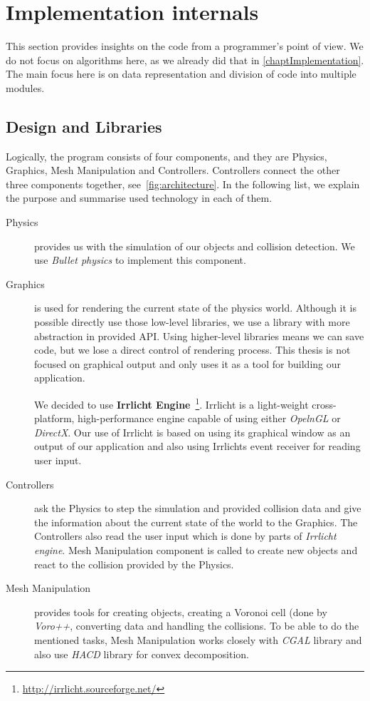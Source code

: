 \chapter{Implementation internals}
\label{app:implementation}

This section provides insights on the code from a programmer's point of view. We do not focus on algorithms here, as we already did that in \cref{chaptImplementation}. The main focus here is on data representation and division of code into multiple modules.

\section{Design and Libraries}
Logically, the program consists of four components, and they are Physics, Graphics, Mesh Manipulation and Controllers. Controllers connect the other three components together, see~\cref{fig:architecture}. In the following list, we explain the purpose and summarise used technology in each of them.
\begin{description}
\item[Physics] provides us with the simulation of our objects and collision detection. We use \emph{Bullet physics} to implement this component.
\item[Graphics] is used for rendering the current state of the physics world. Although it is possible directly use those low-level libraries, we use a library with more abstraction in provided API. Using higher-level libraries means we can save code, but we lose a direct control of rendering process. This thesis is not focused on graphical output and only uses it as a tool for building our application.

We decided to use \textbf{Irrlicht Engine}~\footnote{\url{http://irrlicht.sourceforge.net/}}. Irrlicht is a light-weight cross-platform, high-performance engine capable of using either  \emph{OpelnGL} or \emph{DirectX}. Our use of Irrlicht is based on using its graphical window as an output of our application and also using Irrlichts event receiver for reading user input.

\item[Controllers] ask the Physics to step the simulation and provided collision data and give the information about the current state of the world to the Graphics. The Controllers also read the user input which is done by parts of \emph{Irrlicht engine}. Mesh Manipulation component is called to create new objects and react to the collision provided by the Physics.
\item[Mesh Manipulation] provides tools for creating objects, creating a Voronoi cell (done by \emph{Voro++}, converting data and handling the collisions. To be able to do the mentioned tasks, Mesh Manipulation works closely with \emph{CGAL} library and also use \emph{HACD} library for convex decomposition.
\end{description}



